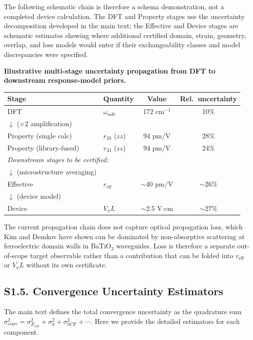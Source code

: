 \documentclass[onecolumn,superscriptaddress,amsmath,amssymb,longbibliography]{revtex4-2}
\newcommand{\conv}{\mathrm{conv}}
\newcommand{\Ecut}{E_{\mathrm{cut}}}
\begin{document}
The following schematic chain is therefore a schema demonstration, not a
completed device calculation. The DFT and Property stages use the uncertainty
decomposition developed in the main text; the Effective and Device stages are
schematic estimates showing where additional certified domain, strain,
geometry, overlap, and loss models would enter if their exchangeability
classes and model discrepancies were specified.

\begin{center}
\textbf{Illustrative multi-stage uncertainty propagation from DFT to
downstream response-model priors.}\\[0.5em]
\begin{tabular}{llcc}
\toprule
Stage & Quantity & Value & Rel.\ uncertainty \\
\midrule
DFT & $\omega_{\mathrm{soft}}$ & 172 cm$^{-1}$ & 10\% \\
$\downarrow$ ($\times 2$ amplification) & & & \\
Property (single calc) & $r_{33}$ ($zz$) & 94 pm/V & 28\% \\
Property (library-fused) & $r_{33}$ ($zz$) & 94 pm/V & 24\% \\
\midrule
\multicolumn{4}{l}{\textit{Downstream stages to be certified:}} \\
$\downarrow$ (microstructure averaging) & & & \\
Effective & $r_{\mathrm{eff}}$ & $\sim$40 pm/V & $\sim$26\% \\
$\downarrow$ (device model) & & & \\
Device & $V_\pi L$ & $\sim$2.5 V$\cdot$cm & $\sim$27\% \\
\bottomrule
\end{tabular}
\end{center}

The current propagation chain does not capture optical propagation loss, which
Kim and Demkov \cite{Kim2025_loss} have shown can be dominated by
non-absorptive scattering at ferroelectric domain walls in BaTiO$_3$
waveguides. Loss is therefore a separate out-of-scope target observable rather
than a contribution that can be folded into $r_{\mathrm{eff}}$ or $V_\pi L$
without its own certificate.


\subsection{S1.5. Convergence Uncertainty Estimators}
\label{sec:si_convergence_est}

The main text defines the total convergence uncertainty as the quadrature sum
$\sigma_\conv^2 = \sigma_{\Ecut}^2 + \sigma_k^2 + \sigma_{\mathrm{SCF}}^2 +
\cdots$. Here we provide the detailed estimators for each component.
\end{document}
